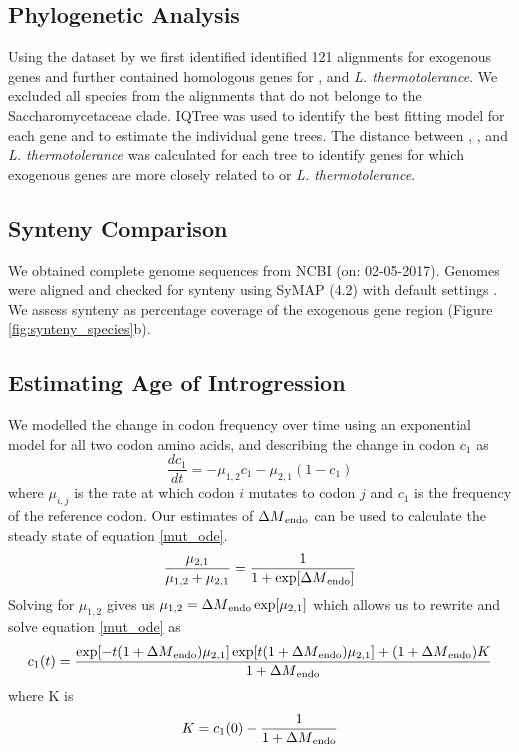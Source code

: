 \documentclass[fleqn,letterpaper]{article}
\begin{document}
\subsection*{Phylogenetic Analysis}
Using the dataset by \citet{shen2018} we first identified identified 121 alignments for exogenous genes and further contained homologous genes for \gossypii, and \textit{L. thermotolerance}.
We excluded all species from the alignments that do not belonge to the Saccharomycetaceae clade. 
IQTree \citep{naguyen2015} was used to identify the best fitting model for each gene and to estimate the individual gene trees.
The distance between \kluyveri, \gossypii, and \textit{L. thermotolerance} was calculated for each tree to identify genes for which exogenous genes are more closely related to \gossypii or  \textit{L. thermotolerance}.

\subsection*{Synteny Comparison}
We obtained complete genome sequences from NCBI (on: 02-05-2017).
Genomes were aligned and checked for synteny using SyMAP (4.2) with default settings \citep{soderlund2006, soderlund2011}.
We assess synteny as percentage coverage of the exogenous gene region (Figure \ref{fig:synteny_species}b).

\subsection*{Estimating Age of Introgression}
We modelled the change in codon frequency over time using an exponential model for all two codon amino acids, and describing the change in codon $c_1$ as
\begin{equation}
\frac{d c_1}{d t} = -\mu_{1,2}c_1 - \mu_{2,1}(1-c_1)
\label{mut_ode}
\end{equation}
where $\mu_{i,j}$ is the rate at which codon $i$ mutates to codon $j$ and $c_1$ is the frequency of the reference codon.
Our estimates of ${\Delta M}_\text{endo}$ can be used to calculate the steady state of equation \ref{mut_ode}.
\begin{equation}
\frac{\mu_{2,1}}{\mu_{1,2} + \mu_{2,1}} = \frac{1}{1+\exp[{\Delta M}_\text{endo}]}
\end{equation}
Solving for $\mu_{1,2}$ gives us $\mu_{1,2} = {\Delta M}_\text{endo}\exp[\mu_{2,1}]$ which allows us to rewrite and solve equation \ref{mut_ode} as
\begin{equation}
c_1(t) = \frac{\exp[-t(1+{\Delta M}_\text{endo})\mu_{2,1}]\exp[t(1+{\Delta M}_\text{endo})\mu_{2,1}] + (1+{\Delta M}_\text{endo})K}{1+{\Delta M}_\text{endo}}
\label{mut_close_form}
\end{equation}
where K is
\begin{equation}
K = c_1(0) - \frac{1}{1+{\Delta M}_\text{endo}}
\end{equation}
\end{document}
